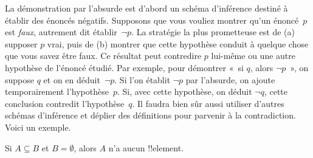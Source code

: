 \documentclass[../../../include/open-logic-section]{subfiles}
\begin{document}


La démonstration par l'absurde est d'abord un schéma
d'inférence destiné à établir des énoncés négatifs.
Supposons que vous vouliez montrer qu'un énoncé~$p$
est \emph{faux}, autrement dit établir~$\lnot p$.
La stratégie la plus prometteuse est de
(a) supposer $p$ vrai, puis de (b) montrer
que cette hypothèse conduit à quelque chose
que vous savez être faux. Ce résultat peut
contredire $p$ lui-même ou une autre hypothèse
de l'énoncé étudié. Par exemple, pour démontrer
«~si $q$, alors $\lnot p$~», on suppose $q$
et on en déduit~$\lnot p$. Si l'on établit
$\lnot p$ par l'absurde, on ajoute
temporairement l'hypothèse~$p$. Si, avec cette
hypothèse, on déduit $\lnot q$, cette conclusion
contredit l'hypothèse~$q$. Il faudra bien sûr aussi utiliser
d'autres schémas d'inférence et déplier
des définitions pour parvenir à la
contradiction. Voici un exemple.

\begin{prop}
  Si $A \subseteq B$ et $B = \emptyset$,
  alors $A$ n'a aucun !!{element}.
\end{prop}
\end{document}
